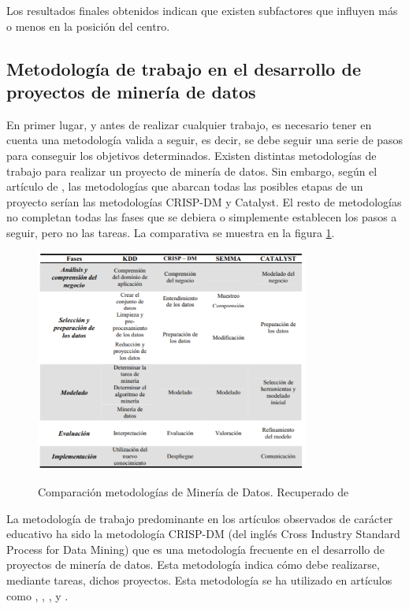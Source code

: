 Los resultados finales obtenidos indican que existen subfactores que influyen más o menos en la posición del centro.

\subsection{Metodología de trabajo en el desarrollo de proyectos de minería de datos}
En primer lugar, y antes de realizar cualquier trabajo, es necesario tener en cuenta una metodología valida a seguir, es decir, se debe seguir una serie de pasos para conseguir los objetivos determinados. Existen distintas metodologías de trabajo para realizar un proyecto de minería de datos. Sin embargo, según el artículo de , las metodologías que abarcan todas las posibles etapas de un proyecto serían las metodologías CRISP-DM y Catalyst. El resto de metodologías no completan todas las fases que se debiera o simplemente establecen los pasos a seguir, pero no las tareas. La comparativa se muestra en la figura \ref{fig:compMod}.

\begin{figure}[htb]
	\centering
	\caption{
		Comparación metodologías de Minería de Datos. Recuperado de \protect{}
	}
	\includegraphics[width=0.8\textwidth]{recursos/ComparacionModelosDM}
	\label{fig:compMod}
\end{figure}
\FloatBarrier


La metodología de trabajo predominante en los artículos observados de carácter educativo ha sido la metodología CRISP-DM (del inglés Cross Industry Standard Process for Data Mining) que es una metodología frecuente en el desarrollo de proyectos de minería de datos. Esta metodología indica cómo debe realizarse, mediante tareas, dichos proyectos. Esta metodología se ha utilizado en artículos como , , ,  y .

